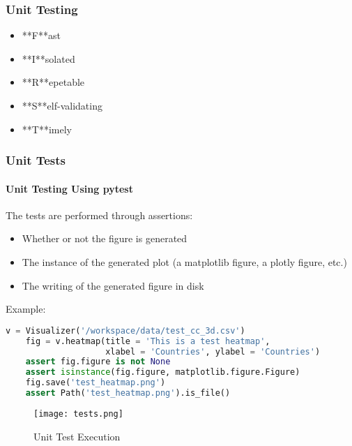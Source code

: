 \begin{frame}
  \frametitle{Unit Testing}

  \begin{itemize}
    \item **F**ast
    \item **I**solated
    \item **R**epetable 
    \item **S**elf-validating
    \item **T**imely
\end{itemize}

\end{frame}



\begin{frame}[fragile,shrink=30]
  \frametitle{Unit Tests}
  \framesubtitle{Unit Testing Using pytest}
  

  The tests are performed through assertions:
  \begin{itemize}
    \item Whether or not the figure is generated
    \item The instance of the generated plot (a matplotlib figure, a plotly figure, etc.) 
    \item The writing of the generated figure in disk
  \end{itemize}

  \vspace{5mm}

  Example:
  \begin{lstlisting}[language=Python]
    v = Visualizer('/workspace/data/test_cc_3d.csv')
    fig = v.heatmap(title = 'This is a test heatmap',
                    xlabel = 'Countries', ylabel = 'Countries')
    assert fig.figure is not None
    assert isinstance(fig.figure, matplotlib.figure.Figure)
    fig.save('test_heatmap.png')
    assert Path('test_heatmap.png').is_file()
  \end{lstlisting}

  \begin{figure}[h]
    \centering
    \texttt{[image: tests.png]}
    \caption{Unit Test Execution}
    \label{fig:tests}
  \end{figure}
  

\end{frame}
